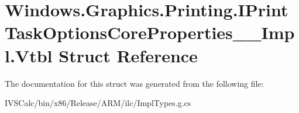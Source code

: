 \hypertarget{struct_windows_1_1_graphics_1_1_printing_1_1_i_print_task_options_core_properties_____impl_1_1_vtbl}{}\section{Windows.\+Graphics.\+Printing.\+I\+Print\+Task\+Options\+Core\+Properties\+\_\+\+\_\+\+Impl.\+Vtbl Struct Reference}
\label{struct_windows_1_1_graphics_1_1_printing_1_1_i_print_task_options_core_properties_____impl_1_1_vtbl}


The documentation for this struct was generated from the following file\+:\begin{DoxyCompactItemize}
\item 
I\+V\+S\+Calc/bin/x86/\+Release/\+A\+R\+M/ilc/Impl\+Types.\+g.\+cs\end{DoxyCompactItemize}

